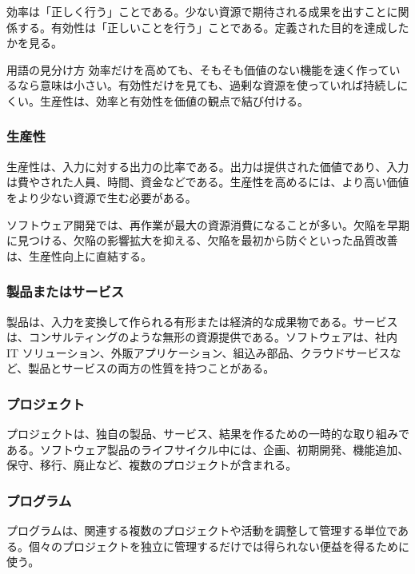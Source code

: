 効率は「正しく行う」ことである。少ない資源で期待される成果を出すことに関係する。有効性は「正しいことを行う」ことである。定義された目的を達成したかを見る。

\begin{notebox}{用語の見分け方}
効率だけを高めても、そもそも価値のない機能を速く作っているなら意味は小さい。有効性だけを見ても、過剰な資源を使っていれば持続しにくい。生産性は、効率と有効性を価値の観点で結び付ける。
\end{notebox}

\subsubsection{生産性}

生産性は、入力に対する出力の比率である。出力は提供された価値であり、入力は費やされた人員、時間、資金などである。生産性を高めるには、より高い価値をより少ない資源で生む必要がある。

ソフトウェア開発では、再作業が最大の資源消費になることが多い。欠陥を早期に見つける、欠陥の影響拡大を抑える、欠陥を最初から防ぐといった品質改善は、生産性向上に直結する。

\subsubsection{製品またはサービス}

製品は、入力を変換して作られる有形または経済的な成果物である。サービスは、コンサルティングのような無形の資源提供である。ソフトウェアは、社内 IT ソリューション、外販アプリケーション、組込み部品、クラウドサービスなど、製品とサービスの両方の性質を持つことがある。

\subsubsection{プロジェクト}

プロジェクトは、独自の製品、サービス、結果を作るための一時的な取り組みである。ソフトウェア製品のライフサイクル中には、企画、初期開発、機能追加、保守、移行、廃止など、複数のプロジェクトが含まれる。

\subsubsection{プログラム}

プログラムは、関連する複数のプロジェクトや活動を調整して管理する単位である。個々のプロジェクトを独立に管理するだけでは得られない便益を得るために使う。


